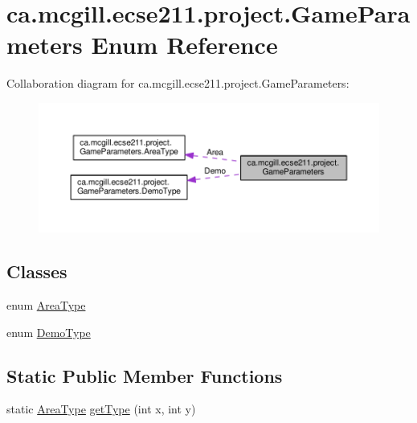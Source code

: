 \hypertarget{enumca_1_1mcgill_1_1ecse211_1_1project_1_1_game_parameters}{}\section{ca.\+mcgill.\+ecse211.\+project.\+Game\+Parameters Enum Reference}
\label{enumca_1_1mcgill_1_1ecse211_1_1project_1_1_game_parameters}


Collaboration diagram for ca.\+mcgill.\+ecse211.\+project.\+Game\+Parameters\+:\nopagebreak
\begin{figure}[H]
\begin{center}
\leavevmode
\includegraphics[width=350pt]{enumca_1_1mcgill_1_1ecse211_1_1project_1_1_game_parameters__coll__graph}
\end{center}
\end{figure}
\subsection*{Classes}
\begin{DoxyCompactItemize}
\item 
enum \hyperlink{enumca_1_1mcgill_1_1ecse211_1_1project_1_1_game_parameters_1_1_area_type}{Area\+Type}
\item 
enum \hyperlink{enumca_1_1mcgill_1_1ecse211_1_1project_1_1_game_parameters_1_1_demo_type}{Demo\+Type}
\end{DoxyCompactItemize}
\subsection*{Static Public Member Functions}
\begin{DoxyCompactItemize}
\item 
static \hyperlink{enumca_1_1mcgill_1_1ecse211_1_1project_1_1_game_parameters_1_1_area_type}{Area\+Type} \hyperlink{enumca_1_1mcgill_1_1ecse211_1_1project_1_1_game_parameters_a4e7713b30588fc0b2af065db0b198b2c}{get\+Type} (int x, int y)
\end{DoxyCompactItemize}
